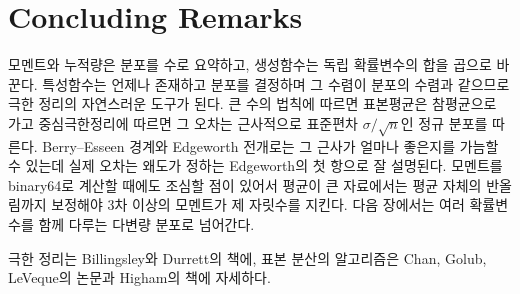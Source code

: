 \section{Concluding Remarks}

모멘트와 누적량은 분포를 수로 요약하고, 생성함수는 독립 확률변수의 합을 곱으로 바꾼다. 특성함수는 언제나 존재하고 분포를 결정하며 그 수렴이 분포의 수렴과 같으므로 극한 정리의 자연스러운 도구가 된다. 큰 수의 법칙에 따르면 표본평균은 참평균으로 가고 중심극한정리에 따르면 그 오차는 근사적으로 표준편차 $\sigma/\sqrt n$인 정규 분포를 따른다. Berry--Esseen 경계와 Edgeworth 전개로는 그 근사가 얼마나 좋은지를 가늠할 수 있는데 실제 오차는 왜도가 정하는 Edgeworth의 첫 항으로 잘 설명된다. 모멘트를 binary64로 계산할 때에도 조심할 점이 있어서 평균이 큰 자료에서는 평균 자체의 반올림까지 보정해야 3차 이상의 모멘트가 제 자릿수를 지킨다. 다음 장에서는 여러 확률변수를 함께 다루는 다변량 분포로 넘어간다.

극한 정리는 Billingsley\cite{billingsley1995}와 Durrett\cite{durrett2019}의 책에, 표본 분산의 알고리즘은 Chan, Golub, LeVeque의 논문\cite{chan1983variance}과 Higham의 책\cite{higham2002accuracy}에 자세하다.

\chapterreferences
